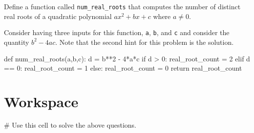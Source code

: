 \documentclass{ximera}
\begin{document}
\begin{question}
	Define a function called \verb|num_real_roots| that computes the number of distinct real roots of a quadratic polynomial $ax^2+bx+c$ where $a\neq 0$.
	\begin{hint}
	Consider having three inputs for this function, \verb|a|, \verb|b|, and \verb|c| and consider the quantity $b^2-4ac$. Note that the second hint for this problem is the solution.
	\end{hint}
	\begin{hint}
\begin{sageCell}
def num_real_roots(a,b,c):
        d = b**2 - 4*a*c
        if d > 0:
                real_root_count = 2
        elif d == 0:
                real_root_count = 1
        else:
                real_root_count = 0
        return real_root_count
\end{sageCell}
	\end{hint}
\end{question}

\section{Workspace}

\begin{sageCell}
# Use this cell to solve the above questions.
\end{sageCell}
\end{document}
